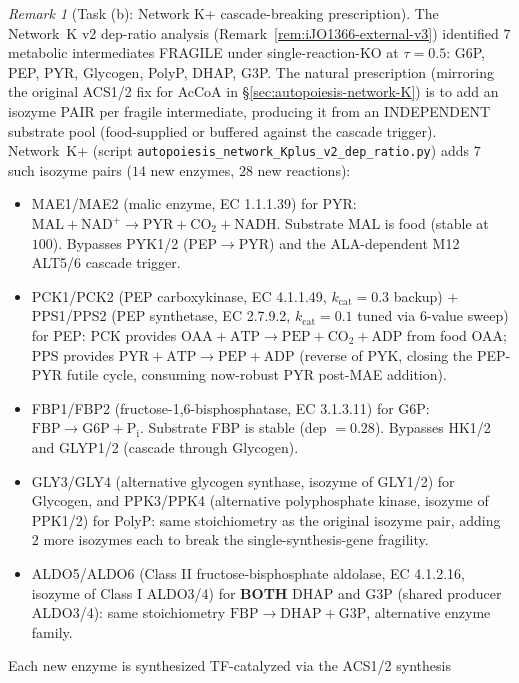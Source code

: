 \documentclass[11pt,a4paper]{article}
\theoremstyle{plain}
\theoremstyle{definition}
\theoremstyle{remark}
\newtheorem{remark}[theorem]{Remark}
\begin{document}
\begin{remark}[Task (b): Network K+ cascade-breaking prescription]
\label{rem:netkplus-cascade-breaking-v4}
The Network~K v2 dep-ratio analysis
(Remark~\ref{rem:iJO1366-external-v3}) identified $7$ metabolic
intermediates FRAGILE under single-reaction-KO at $\tau = 0.5$:
G6P, PEP, PYR, Glycogen, PolyP, DHAP, G3P. The natural prescription
(mirroring the original ACS1/2 fix for AcCoA in
\S\ref{sec:autopoiesis-network-K}) is to add an isozyme PAIR per
fragile intermediate, producing it from an INDEPENDENT substrate pool
(food-supplied or buffered against the cascade trigger). Network~K+
(script \texttt{autopoiesis\_network\_Kplus\_v2\_dep\_ratio.py}) adds
$7$ such isozyme pairs ($14$ new enzymes, $28$ new reactions):
\begin{itemize}
\item MAE1/MAE2 (malic enzyme, EC 1.1.1.39) for PYR:
  $\mathrm{MAL} + \mathrm{NAD}^+ \to \mathrm{PYR} + \mathrm{CO}_2 +
  \mathrm{NADH}$. Substrate MAL is food (stable at $100$). Bypasses
  PYK1/2 (PEP$\to$PYR) and the ALA-dependent M12 ALT5/6 cascade trigger.
\item PCK1/PCK2 (PEP carboxykinase, EC 4.1.1.49, $k_{\mathrm{cat}} =
  0.3$ backup) + PPS1/PPS2 (PEP synthetase, EC 2.7.9.2, $k_{\mathrm{cat}}
  = 0.1$ tuned via $6$-value sweep) for PEP: PCK provides
  $\mathrm{OAA} + \mathrm{ATP} \to \mathrm{PEP} + \mathrm{CO}_2 +
  \mathrm{ADP}$ from food OAA; PPS provides $\mathrm{PYR} + \mathrm{ATP}
  \to \mathrm{PEP} + \mathrm{ADP}$ (reverse of PYK, closing the PEP-PYR
  futile cycle, consuming now-robust PYR post-MAE addition).
\item FBP1/FBP2 (fructose-1,6-bisphosphatase, EC 3.1.3.11) for G6P:
  $\mathrm{FBP} \to \mathrm{G6P} + \mathrm{P_i}$. Substrate FBP is stable
  (dep $= 0.28$). Bypasses HK1/2 and GLYP1/2 (cascade through Glycogen).
\item GLY3/GLY4 (alternative glycogen synthase, isozyme of GLY1/2) for
  Glycogen, and PPK3/PPK4 (alternative polyphosphate kinase, isozyme of
  PPK1/2) for PolyP: same stoichiometry as the original isozyme pair,
  adding $2$ more isozymes each to break the single-synthesis-gene
  fragility.
\item ALDO5/ALDO6 (Class II fructose-bisphosphate aldolase, EC 4.1.2.16,
  isozyme of Class I ALDO3/4) for \textbf{BOTH} DHAP and G3P (shared
  producer ALDO3/4): same stoichiometry $\mathrm{FBP} \to \mathrm{DHAP}
  + \mathrm{G3P}$, alternative enzyme family.
\end{itemize}
Each new enzyme is synthesized TF-catalyzed via the ACS1/2 synthesis

\end{remark}
\end{document}
